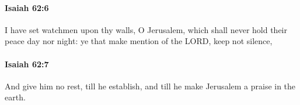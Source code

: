 		\paragraph{Isaiah 62:6} %
			\label{ISAIAH-62-6}

			I have set watchmen upon thy walls, O Jerusalem, which shall never hold their peace day nor night: ye that make mention of the LORD, keep not silence,


		\paragraph{Isaiah 62:7} %
			\label{ISAIAH-62-7}

			And give him no rest, till he establish, and till he make Jerusalem a praise in the earth.


